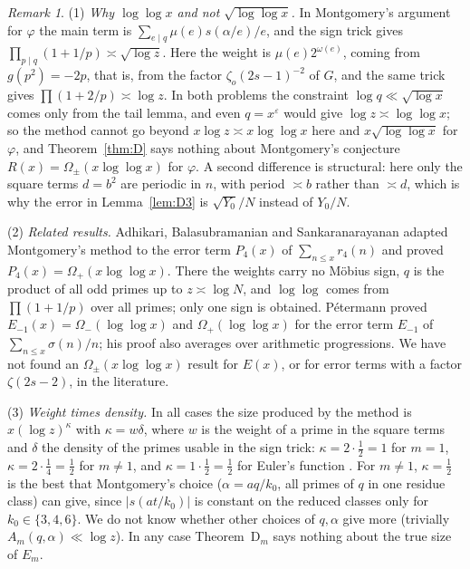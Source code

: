 \documentclass[11pt]{amsart}
\theoremstyle{remark}
\newtheorem{remark}{Remark}
\newcommand{\zo}{\zeta_{o}}
\begin{document}
\begin{remark}\label{rem:D}
(1) \emph{Why $\log\log x$ and not $\sqrt{\log\log x}$.} In Montgomery's argument for $\varphi$ the main term is $\sum_{e\mid q}\mu(e)s(\alpha/e)/e$, and the sign trick gives $\prod_{p\mid q}(1+1/p)\asymp\sqrt{\log z}$. Here the weight is $\mu(e)2^{\omega(e)}$, coming from $g(p^2)=-2p$, that is, from the factor $\zo(2s-1)^{-2}$ of $G$, and the same trick gives $\prod(1+2/p)\asymp\log z$. In both problems the constraint $\log q\ll\sqrt{\log x}$ comes only from the tail lemma, and even $q=x^\varepsilon$ would give $\log z\asymp\log\log x$; so the method cannot go beyond $x\log z\asymp x\log\log x$ here and $x\sqrt{\log\log x}$ for $\varphi$, and Theorem~\ref{thm:D} says nothing about Montgomery's conjecture $R(x)=\Omega_\pm(x\log\log x)$ for $\varphi$. A second difference is structural: here only the square terms $d=b^2$ are periodic in $n$, with period $\asymp b$ rather than $\asymp d$, which is why the error in Lemma~\ref{lem:D3} is $\sqrt{Y_0}/N$ instead of $Y_0/N$.

(2) \emph{Related results.} Adhikari, Balasubramanian and Sankaranarayanan \cite{ABS} adapted Montgomery's method to the error term $P_4(x)$ of $\sum_{n\le x}r_4(n)$ and proved $P_4(x)=\Omega_+(x\log\log x)$. There the weights carry no M\"obius sign, $q$ is the product of all odd primes up to $z\asymp\log N$, and $\log\log$ comes from $\prod(1+1/p)$ over all primes; only one sign is obtained. P\'etermann proved $E_{-1}(x)=\Omega_-(\log\log x)$ \cite{Pe87} and $\Omega_+(\log\log x)$ \cite{Pe88} for the error term $E_{-1}$ of $\sum_{n\le x}\sigma(n)/n$; his proof also averages over arithmetic progressions. We have not found an $\Omega_\pm(x\log\log x)$ result for $E(x)$, or for error terms with a factor $\zeta(2s-2)$, in the literature.

(3) \emph{Weight times density.} In all cases the size produced by the method is $x(\log z)^{\kappa}$ with $\kappa=w\delta$, where $w$ is the weight of a prime in the square terms and $\delta$ the density of the primes usable in the sign trick: $\kappa=2\cdot\frac12=1$ for $m=1$, $\kappa=2\cdot\frac14=\frac12$ for $m\neq1$, and $\kappa=1\cdot\frac12=\frac12$ for Euler's function \cite{Mo}. For $m\neq1$, $\kappa=\frac12$ is the best that Montgomery's choice ($\alpha=aq/k_0$, all primes of $q$ in one residue class) can give, since $|s(at/k_0)|$ is constant on the reduced classes only for $k_0\in\{3,4,6\}$. We do not know whether other choices of $q,\alpha$ give more (trivially $A_m(q,\alpha)\ll\log z$). In any case Theorem~D$_m$ says nothing about the true size of $E_m$.


\end{remark}
\end{document}
